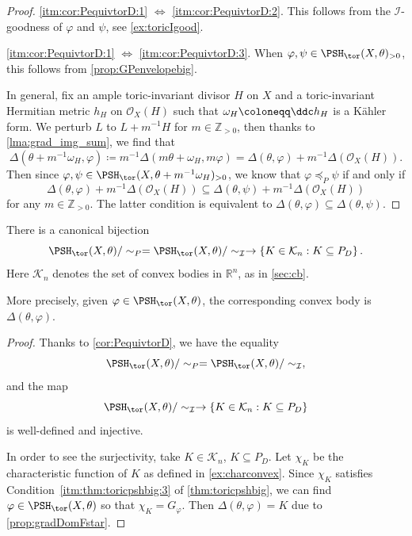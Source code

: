 \begin{proof}
    \ref{itm:cor:PequivtorD:1} $\iff$ \ref{itm:cor:PequivtorD:2}. This follows from the $\mathcal{I}$-goodness of $\varphi$ and $\psi$, see \cref{ex:toricIgood}.

    \ref{itm:cor:PequivtorD:1} $\iff$ \ref{itm:cor:PequivtorD:3}. When $\varphi,\psi\in \PSH_{\tor}(X,\theta)_{>0}$, this follows from \cref{prop:GPenvelopebig}.

    In general, fix an ample toric-invariant divisor $H$ on $X$ and a toric-invariant Hermitian metric $h_H$ on $\mathcal{O}_X(H)$ such that $\omega_H\coloneqq \ddc h_H$ is a Kähler form. We perturb $L$ to $L+m^{-1}H$ for $m\in \mathbb{Z}_{>0}$, then thanks to \cref{lma:grad_img_sum}, we find that
    \[
    \Delta(\theta+m^{-1}\omega_H,\varphi)\coloneqq m^{-1}\Delta(m\theta+\omega_H,m\varphi)=\Delta(\theta,\varphi)+m^{-1}\Delta\left(\mathcal{O}_X(H)\right).
    \]
    Then since $\varphi,\psi\in \PSH_{\tor}(X,\theta+m^{-1}\omega_H)_{>0}$, we know that $\varphi\preceq_P \psi$ if and only if
    \[
    \Delta(\theta,\varphi)+m^{-1}\Delta\left(\mathcal{O}_X(H)\right)\subseteq \Delta(\theta,\psi)+m^{-1}\Delta\left(\mathcal{O}_X(H)\right)
    \]
    for any $m\in \mathbb{Z}_{>0}$. The latter condition is equivalent to $\Delta(\theta,\varphi)\subseteq \Delta(\theta,\psi)$.
\end{proof}
\begin{corollary}\label{cor:bij_conv_torpsh}
    There is a canonical bijection
    \[
    \PSH_{\tor}(X,\theta)/\sim_{P}=\PSH_{\tor}(X,\theta)/\sim_{\mathcal{I}}\rightarrow \left\{K\in \mathcal{K}_n: K \subseteq P_D \right\}.
    \]
    Here $\mathcal{K}_n$ denotes the set of convex bodies in $\mathbb{R}^n$, as in \cref{sec:cb}.
\end{corollary}
More precisely, given $\varphi\in \PSH_{\tor}(X,\theta)$, the corresponding convex body is $\Delta(\theta,\varphi)$.

\begin{proof}
    Thanks to \cref{cor:PequivtorD}, we have the equality
    \[
    \PSH_{\tor}(X,\theta)/\sim_{P}=\PSH_{\tor}(X,\theta)/\sim_{\mathcal{I}},
    \]
    and the map
    \[
    \PSH_{\tor}(X,\theta)/\sim_{\mathcal{I}}\rightarrow \left\{K\in \mathcal{K}_n: K \subseteq P_D \right\}
    \]
    is well-defined and injective.

    In order to see the surjectivity, take $K\in \mathcal{K}_n$, $K\subseteq P_D$. Let $\chi_K$ be the characteristic function of $K$ as defined in \cref{ex:charconvex}. Since $\chi_K$ satisfies Condition~\ref{itm:thm:toricpshbig:3} of \cref{thm:toricpshbig}, we can find $\varphi\in \PSH_{\tor}(X,\theta)$ so that $\chi_K=G_{\varphi}$. Then $\Delta(\theta,\varphi)=K$ due to \cref{prop:gradDomFstar}.
\end{proof}

